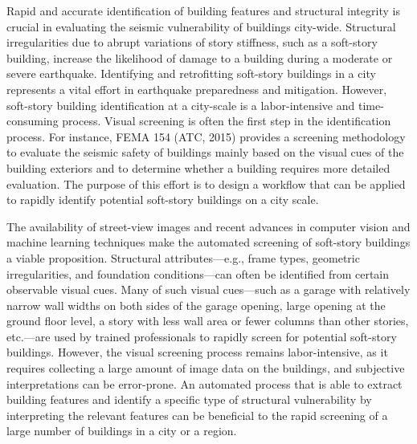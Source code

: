 Rapid and accurate identification of building features and structural integrity is crucial in evaluating the seismic vulnerability of buildings city-wide. Structural irregularities due to abrupt variations of story stiffness, such as a soft-story building, increase the likelihood of damage to a building during a moderate or severe earthquake. Identifying and retrofitting soft-story buildings in a city represents a vital effort in earthquake preparedness and mitigation. However, soft-story building identification at a city-scale is a labor-intensive and time-consuming process. Visual screening is often the first step in the identification process. For instance, FEMA 154 (ATC, 2015) provides a screening methodology to evaluate the seismic safety of buildings mainly based on the visual cues of the building exteriors and to determine whether a building requires more detailed evaluation. The purpose of this effort is to design a workflow that can be applied to rapidly identify potential soft-story buildings on a city scale. 

The availability of street-view images and recent advances in computer vision and machine learning techniques make the automated screening of soft-story buildings a viable proposition. Structural attributes—e.g., frame types, geometric irregularities, and foundation conditions—can often be identified from certain observable visual cues. Many of such visual cues—such as a garage with relatively narrow wall widths on both sides of the garage opening, large opening at the ground floor level, a story with less wall area or fewer columns than other stories, etc.—are used by trained professionals to rapidly screen for potential soft-story buildings. However, the visual screening process remains labor-intensive, as it requires collecting a large amount of image data on the buildings, and subjective interpretations can be error-prone. An automated process that is able to extract building features and identify a specific type of structural vulnerability by interpreting the relevant features can be beneficial to the rapid screening of a large number of buildings in a city or a region. 

